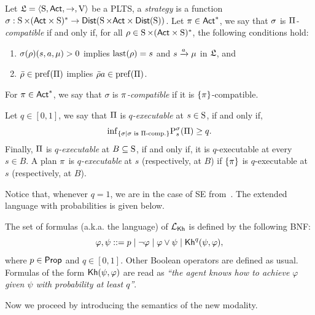 \begin{definition}\label{def:strategy-comp-exec}
    Let $\model=\tup{\S,\ACT,\ra,\V}$ be a PLTS, a \emph{strategy} is a function $\strategy: \S\times(\ACT\times\S)^* \ra \dist(\S\times\ACT\times\dist(\S))$. Let $\plan\in\ACT^*$, we say that $\strategy$ is \emph{$\plans$-compatible} if and only if, for all $\rho\in \S\times(\ACT\times\S)^*$, the following conditions hold:
    \begin{enumerate}
        \item $\strategy(\rho)(s,a,\mu)>0$ implies $\last(\rho)=s$ and $s\reach{a}\mu$ in $\model$, and 
        \item $\bar{\rho}\in\pref(\plans)$ implies $\bar{\rho}a\in\pref(\plans)$.
    \end{enumerate}
    For $\plan\in\ACT^*$, we say that $\sigma$ is \emph{$\plan$-compatible} if it is $\{\plan\}$-compatible. 

    Let $q\in[0,1]$, we say that $\plans$ is \emph{$q$-executable} at $s\in\S$, if and only if, 
    \[
        \infim_{\{\strategy \mid \strategy \text{ is } \plans\text{-comp.}\}} \probability^\strategy_{s}(\plans)\geq q.
    \]
    Finally, $\plans$ is \emph{$q$-executable} at $B\subseteq\S$, if and only if, it is $q$-executable at every $s\in B$. 
    A plan $\plan$ is \emph{$q$-executable} at $s$ (respectively, at $B$) if $\{\plan\}$ is $q$-executable at $s$ (respectively, at $B$). 
\end{definition}

Notice that, whenever $q=1$, we are in the case of SE from~. The extended language with probabilities is given below.


\begin{definition}
    \label{def:syntax-extended}
    The set of formulas (a.k.a. the language) of $\Khlogic$ is defined by the following BNF:
    \[
        \varphi, \psi ::= p \mid \neg \varphi \mid \varphi \vee \psi \mid \kh^q(\psi,\varphi),
    \]
    where $p\in\PROP$ and $q\in[0,1]$. Other Boolean operators are defined as usual. Formulas of the form $\kh(\psi,\varphi)$ are read as \emph{``the agent knows how to achieve $\varphi$ given $\psi$ with probability at least $q$''}.
\end{definition}




Now we proceed by introducing the semantics of the new modality.

